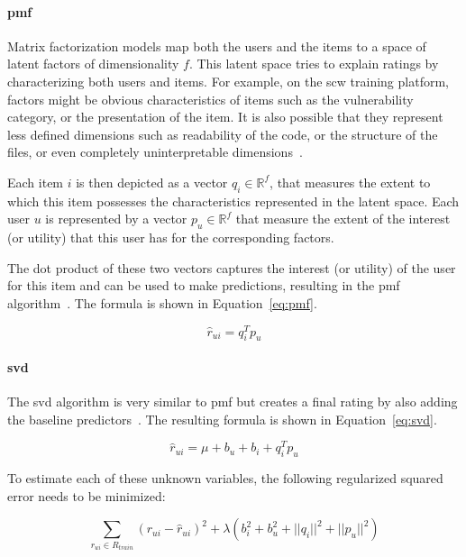 \paragraph{\gls{pmf}}
Matrix factorization models map both the users and the items to a space of latent factors of dimensionality $f$.
This latent space tries to explain ratings by characterizing both users and items.
For example, on the \gls{scw} training platform, factors might be obvious characteristics of items such as the vulnerability category, or the presentation of the item.
It is also possible that they represent less defined dimensions such as readability of the code, or the structure of the files, or even completely uninterpretable dimensions~\cite{Ricci2010}.

Each item $i$ is then depicted as a vector $q_i \in \mathbb{R}^f$, that measures the extent to which this item possesses the characteristics represented in the latent space.
Each user $u$ is represented by a vector $p_u \in \mathbb{R}^f$ that measure the extent of the interest (or utility) that this user has for the corresponding factors.

The dot product of these two vectors captures the interest (or utility) of the user for this item and can be used to make predictions, resulting in the \gls{pmf} algorithm~\cite{mnih2008probabilistic,Hug2020}.
The formula is shown in Equation~\ref{eq:pmf}.

\begin{equation}
  \label{eq:pmf}
  \hat{r}_{ui} = q_i^T p_u 
\end{equation}

\paragraph{\gls{svd}}
The \gls{svd} algorithm is very similar to \gls{pmf} but creates a final rating by also adding the baseline predictors~\cite{koren2009matrix, Ricci2010, Hug2020}. 
The resulting formula is shown in Equation~\ref{eq:svd}.

\begin{equation}
  \label{eq:svd}
  \hat{r}_{ui} = \mu + b_u + b_i + q_i^T p_u 
\end{equation}

To estimate each of these unknown variables, the following regularized squared error needs to be minimized:

\begin{equation}
     \sum_{r_{ui} \in R_{train}} \left(r_{ui} - \hat{r}_{ui} \right)^2 +
        \lambda\left(b_i^2 + b_u^2 + ||q_i||^2 + ||p_u||^2\right)
\end{equation}

